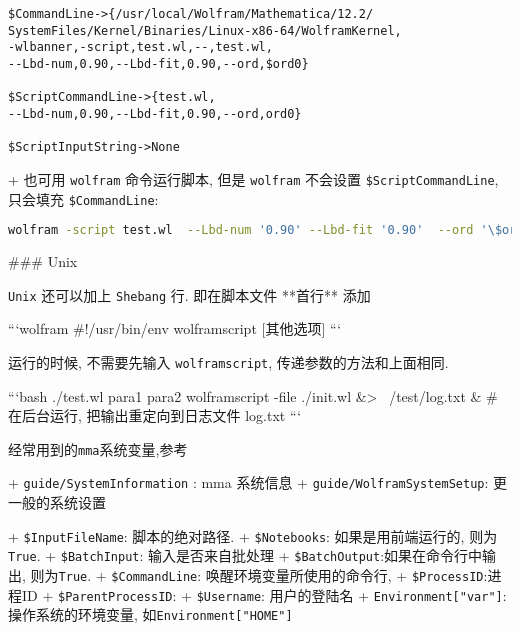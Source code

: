 \begin{lstlisting}
$CommandLine->{/usr/local/Wolfram/Mathematica/12.2/
SystemFiles/Kernel/Binaries/Linux-x86-64/WolframKernel,
-wlbanner,-script,test.wl,--,test.wl,
--Lbd-num,0.90,--Lbd-fit,0.90,--ord,$ord0}

$ScriptCommandLine->{test.wl,
--Lbd-num,0.90,--Lbd-fit,0.90,--ord,ord0}

$ScriptInputString->None
\end{lstlisting}

+ 也可用 \verb`wolfram` 命令运行脚本, 但是 \verb`wolfram` 不会设置 \verb`$ScriptCommandLine`, 只会填充 \verb`$CommandLine`:

\begin{lstlisting}[language=bash]
wolfram -script test.wl  --Lbd-num '0.90' --Lbd-fit '0.90'  --ord '\$ord0'
\end{lstlisting}


### Unix

\verb`Unix` 还可以加上 \verb`Shebang` 行. 即在脚本文件 **首行** 添加

```wolfram
#!/usr/bin/env wolframscript [其他选项]
```

运行的时候, 不需要先输入 \verb`wolframscript`, 传递参数的方法和上面相同.

```bash
./test.wl para1 para2
wolframscript -file ./init.wl &> ~/test/log.txt & # 在后台运行, 把输出重定向到日志文件 log.txt
```

经常用到的\verb`mma`系统变量,参考

+ \verb`guide/SystemInformation` : mma 系统信息
+ \verb`guide/WolframSystemSetup`: 更一般的系统设置

+ \verb`$InputFileName`: 脚本的绝对路径.
+ \verb`$Notebooks`: 如果是用前端运行的, 则为\verb`True`.
+ \verb`$BatchInput`: 输入是否来自批处理
+ \verb`$BatchOutput`:如果在命令行中输出, 则为\verb`True`.
+ \verb`$CommandLine`: 唤醒环境变量所使用的命令行,
+ \verb`$ProcessID`:进程ID
+ \verb`$ParentProcessID`:
+ \verb`$Username`: 用户的登陆名
+ \verb`Environment["var"]`:操作系统的环境变量, 如\verb`Environment["HOME"]`